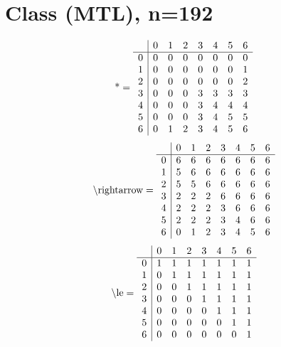 \documentclass[11pt]{article}
\begin{document}
\section{Class (MTL), n=192}
\[\text{*} = 
\begin{array}{r | r r r r r r r}
 & 0 & 1 & 2 & 3 & 4 & 5 & 6 \\ \hline
0 & 0 & 0 & 0 & 0 & 0 & 0 & 0 \\
1 & 0 & 0 & 0 & 0 & 0 & 0 & 1 \\
2 & 0 & 0 & 0 & 0 & 0 & 0 & 2 \\
3 & 0 & 0 & 0 & 3 & 3 & 3 & 3 \\
4 & 0 & 0 & 0 & 3 & 4 & 4 & 4 \\
5 & 0 & 0 & 0 & 3 & 4 & 5 & 5 \\
6 & 0 & 1 & 2 & 3 & 4 & 5 & 6 \\
\end{array}
\]
\[\text{\textbackslash rightarrow} = 
\begin{array}{r | r r r r r r r}
 & 0 & 1 & 2 & 3 & 4 & 5 & 6 \\ \hline
0 & 6 & 6 & 6 & 6 & 6 & 6 & 6 \\
1 & 5 & 6 & 6 & 6 & 6 & 6 & 6 \\
2 & 5 & 5 & 6 & 6 & 6 & 6 & 6 \\
3 & 2 & 2 & 2 & 6 & 6 & 6 & 6 \\
4 & 2 & 2 & 2 & 3 & 6 & 6 & 6 \\
5 & 2 & 2 & 2 & 3 & 4 & 6 & 6 \\
6 & 0 & 1 & 2 & 3 & 4 & 5 & 6 \\
\end{array}
\]
\[\text{\textbackslash le} = 
\begin{array}{r | r r r r r r r}
 & 0 & 1 & 2 & 3 & 4 & 5 & 6 \\ \hline
0 & 1 & 1 & 1 & 1 & 1 & 1 & 1 \\
1 & 0 & 1 & 1 & 1 & 1 & 1 & 1 \\
2 & 0 & 0 & 1 & 1 & 1 & 1 & 1 \\
3 & 0 & 0 & 0 & 1 & 1 & 1 & 1 \\
4 & 0 & 0 & 0 & 0 & 1 & 1 & 1 \\
5 & 0 & 0 & 0 & 0 & 0 & 1 & 1 \\
6 & 0 & 0 & 0 & 0 & 0 & 0 & 1 \\
\end{array}
\]
\end{document}
